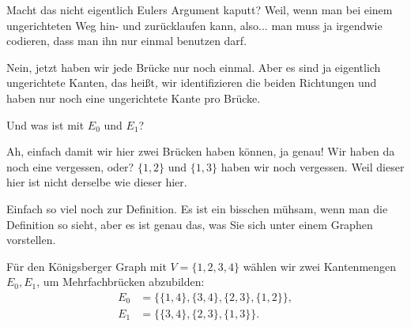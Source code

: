 \begin{student-interaction}[Studentenfrage]
Macht das nicht eigentlich Eulers Argument kaputt? Weil, wenn man bei einem ungerichteten Weg hin- und zurücklaufen kann, also... man muss ja irgendwie codieren, dass man ihn nur einmal benutzen darf.
\end{student-interaction}

\begin{spoken-clean}[00:20:32 - 00:21:12]
Nein, jetzt haben wir jede Brücke nur noch einmal. Aber es sind ja eigentlich ungerichtete Kanten, das heißt, wir identifizieren die beiden Richtungen und haben nur noch eine ungerichtete Kante pro Brücke.
\end{spoken-clean}

\begin{student-interaction}[Studentenfrage]
Und was ist mit $E_0$ und $E_1$?
\end{student-interaction}

\begin{spoken-clean}[00:21:12 - 00:22:55]
Ah, einfach damit wir hier zwei Brücken haben können, ja genau! Wir haben da noch eine vergessen, oder?  $\{1, 2\}$ und $\{1, 3\}$ haben wir noch vergessen. Weil dieser hier ist nicht derselbe wie dieser hier.

Einfach so viel noch zur Definition. Es ist ein bisschen mühsam, wenn man die Definition so sieht, aber es ist genau das, was Sie sich unter einem Graphen vorstellen.
\end{spoken-clean}

\begin{math-stroke}
Für den Königsberger Graph mit $V = \{1, 2, 3, 4\}$ wählen wir zwei Kantenmengen $E_0, E_1$, um Mehrfachbrücken abzubilden:
\begin{align*}
E_0 &= \bigl\{ \{1, 4\}, \{3, 4\}, \{2, 3\}, \{1, 2\} \bigr\}, \\
E_1 &= \bigl\{ \{3, 4\}, \{2, 3\}, \{1, 3\} \bigr\}.
\end{align*}
\end{math-stroke}

